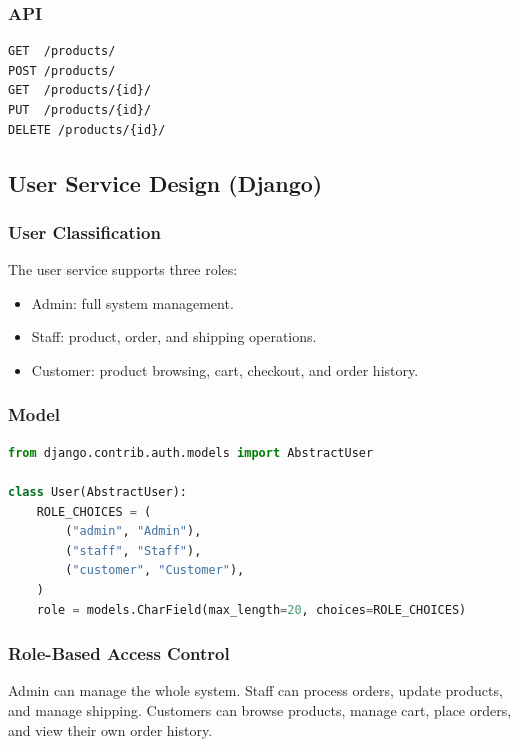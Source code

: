 \documentclass[12pt,a4paper]{article}
\begin{document}
\subsubsection{API}

\begin{lstlisting}[caption={Product service API.}]
GET  /products/
POST /products/
GET  /products/{id}/
PUT  /products/{id}/
DELETE /products/{id}/
\end{lstlisting}

\subsection{User Service Design (Django)}

\subsubsection{User Classification}

The user service supports three roles:

\begin{itemize}
    \item Admin: full system management.
    \item Staff: product, order, and shipping operations.
    \item Customer: product browsing, cart, checkout, and order history.
\end{itemize}

\subsubsection{Model}

\begin{lstlisting}[language=Python,caption={User role model.}]
from django.contrib.auth.models import AbstractUser

class User(AbstractUser):
    ROLE_CHOICES = (
        ("admin", "Admin"),
        ("staff", "Staff"),
        ("customer", "Customer"),
    )
    role = models.CharField(max_length=20, choices=ROLE_CHOICES)
\end{lstlisting}

\subsubsection{Role-Based Access Control}

Admin can manage the whole system. Staff can process orders, update products, and manage shipping. Customers can browse products, manage cart, place orders, and view their own order history.
\end{document}
